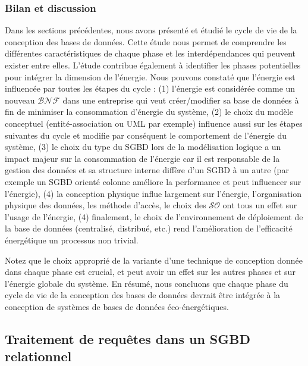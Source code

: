 \subsubsection{Bilan et discussion}
Dans les sections précédentes, nous avons présenté et étudié le cycle de vie de la conception des bases de données. Cette étude nous permet de comprendre les différentes caractéristiques de chaque phase et les interdépendances qui peuvent exister entre elles. L'étude contribue également à identifier les phases potentielles pour intégrer la dimension de l'énergie. Nous pouvons constaté que l'énergie est influencée par toutes les étapes du cycle : (1) l'énergie est considérée comme un nouveau $\mathcal{BNF}$ dans une entreprise qui veut créer/modifier sa base de données à fin de minimiser la consommation d'énergie du système, (2) le choix du modèle conceptuel (entité-association ou UML par exemple) influence aussi sur les étapes suivantes du cycle et modifie par conséquent le comportement de l'énergie du système, (3) le choix du type du SGBD lors de la modélisation logique a un impact majeur sur la consommation de l'énergie car il est responsable de la gestion des données et sa structure interne diffère d'un SGBD à un autre (par exemple un SGBD orienté colonne améliore la performance et peut influencer sur l'énergie), (4) la conception physique influe largement sur l'énergie, l'organisation physique des données, les méthode d'accès, le choix des $\mathcal{SO}$ ont tous un effet sur l'usage de l'énergie, (4) finalement, le choix de l'environnement de déploiement de la base de données (centralisé, distribué, etc.) rend l'amélioration de l'efficacité énergétique un processus non trivial.

Notez que le choix approprié de la variante d'une technique de conception donnée dans chaque phase est crucial, et peut avoir un effet sur les autres phases et sur l'énergie globale du système. En résumé, nous concluons que chaque phase du cycle de vie de la conception des bases de données devrait être intégrée à la conception de systèmes de bases de données éco-énergétiques.

\subsection{Traitement de requêtes dans un SGBD relationnel}

